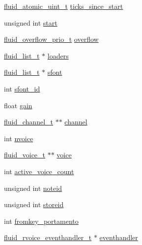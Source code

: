 \begin{DoxyCompactItemize}
\item 
\hyperlink{fluidsynth__priv_8h_ac2b1dee40b52e1e5982fe0f0101413ba}{fluid\+\_\+atomic\+\_\+uint\+\_\+t} \hyperlink{struct__fluid__synth__t_a66cfd8c76e2aa183716ab1eb6e529d7d}{ticks\+\_\+since\+\_\+start}
\item 
unsigned int \hyperlink{struct__fluid__synth__t_a30fd821679b7f3fe45135c211c010fb1}{start}
\item 
\hyperlink{fluid__voice_8h_a1470e84ffede53a3181a35761e016101}{fluid\+\_\+overflow\+\_\+prio\+\_\+t} \hyperlink{struct__fluid__synth__t_a2491ded83c4906c713d034911f6615d3}{overflow}
\item 
\hyperlink{fluid__list_8h_a3ef7535d4290862c0af118569223bd89}{fluid\+\_\+list\+\_\+t} $\ast$ \hyperlink{struct__fluid__synth__t_ae4446eb3ba2731d6944b51d28a16f683}{loaders}
\item 
\hyperlink{fluid__list_8h_a3ef7535d4290862c0af118569223bd89}{fluid\+\_\+list\+\_\+t} $\ast$ \hyperlink{struct__fluid__synth__t_ad37c16bfed217f7053c2b2876fea4ebc}{sfont}
\item 
int \hyperlink{struct__fluid__synth__t_a64d274cd2a1debace88ce6acc22048a9}{sfont\+\_\+id}
\item 
float \hyperlink{struct__fluid__synth__t_aada9dbdeda3719af0a3a173fc59ac5da}{gain}
\item 
\hyperlink{fluidsynth__priv_8h_a9e766203efa8135ece6f462e9caa1b12}{fluid\+\_\+channel\+\_\+t} $\ast$$\ast$ \hyperlink{struct__fluid__synth__t_a6914014a341347e9ba46a2ea21d9cd26}{channel}
\item 
int \hyperlink{struct__fluid__synth__t_a4f14f2ed852384d1d9e0f7848300f9b3}{nvoice}
\item 
\hyperlink{types_8h_a5123ae5ef2d7806475267380c33604c3}{fluid\+\_\+voice\+\_\+t} $\ast$$\ast$ \hyperlink{struct__fluid__synth__t_abafa4495b1eee10130c3359934b446f9}{voice}
\item 
int \hyperlink{struct__fluid__synth__t_a6137bdab89209777a7a63d5f968d7143}{active\+\_\+voice\+\_\+count}
\item 
unsigned int \hyperlink{struct__fluid__synth__t_a77619d68603d1da8030796a8c6f6325e}{noteid}
\item 
unsigned int \hyperlink{struct__fluid__synth__t_aefbd02e23753fb45285c2f64721ef013}{storeid}
\item 
int \hyperlink{struct__fluid__synth__t_ab8955a1a9d3f97a903eb6346dc849e21}{fromkey\+\_\+portamento}
\item 
\hyperlink{fluidsynth__priv_8h_aa59fe8f0195e9f5099f538d38b126e2a}{fluid\+\_\+rvoice\+\_\+eventhandler\+\_\+t} $\ast$ \hyperlink{struct__fluid__synth__t_a2bf5805a6616694e4f0205c04568bf8f}{eventhandler}

\end{DoxyCompactItemize}
